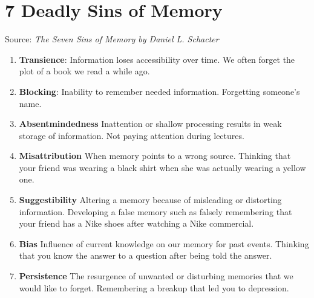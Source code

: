 \section{7 Deadly Sins of Memory}

Source: \textit{The Seven Sins of Memory by Daniel L. Schacter}

\begin{enumerate}
    \item \textbf{Transience}: Information loses accessibility over time.  We often forget the plot of a book we read a while ago.
    
    \item \textbf{Blocking}: Inability to remember needed information.  Forgetting someone's name.
    
    \item \textbf{Absentmindedness} Inattention or shallow processing results in weak storage of information.  Not paying attention during lectures.
    
    \item \textbf{Misattribution}  When memory points to a wrong source.  Thinking that your friend was wearing a black shirt when she was actually wearing a yellow one.
    
    \item \textbf{Suggestibility}  Altering a memory because of misleading or distorting information.  Developing a false memory such as falsely remembering that your friend has a Nike shoes after watching a Nike commercial.
    
    \item \textbf{Bias} Influence of current knowledge on our memory for past events.  Thinking that you know the answer to a question after being told the answer.
    
    \item \textbf{Persistence}  The resurgence of unwanted or disturbing memories that we would like to forget.  Remembering a breakup that led you to depression.
\end{enumerate}